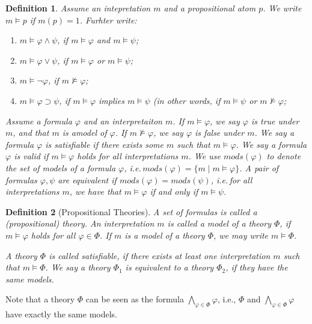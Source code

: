 \documentclass[12pt]{extarticle}
\newtheorem{definition}{Definition}
\begin{document}
\begin{definition}
  Assume an intepretation $m$ and a propositional atom $p$. We write
  $m\models p$ if $m(p)=1$. Furhter write:
  \begin{enumerate}
  \item $m \models \varphi \land \psi  $, if $m \models \varphi$ and $m \models \psi$;
  \item $m \models \varphi \lor \psi  $, if $m \models \varphi$ or $m \models \psi$;
  \item $m \models \neg \varphi $, if $m \not\models \varphi$;
  \item $m \models  \varphi \supset \psi$, if $m \models  \varphi $ implies $m \models  \psi$ (in other words, if  $m \models  \psi$ or  $m \not\models  \varphi $;
    
  \end{enumerate}
  Assume a formula $\varphi$ and an interpretaiton $m$. If
  $m\models \varphi$, we say $\varphi$ is \emph{true under} $m$, and
  that $m$ is a\emph{model} of $\varphi$. If $m\not\models \varphi$,
  we say $\varphi$ is \emph{false under} $m$. We say a formula
  $\varphi$ is \emph{satisfiable} if there exists some $m$ such that
  $m\models \varphi$. \stresspoint We say a formula $\varphi$ is \emph{valid} if
  $m\models \varphi$ holds for all interpretations $m$. \stresspoint We use
  $\mathit{mods}(\varphi)$ to denote the set of models of a formula
  $\varphi$, i.e.\,$\mathit{mods}(\varphi)=\{m\mid m\models\varphi\}$.
  A pair of formulas $\varphi,\psi$ are \emph{equivalent} if
  $\mathit{mods}(\varphi)=\mathit{mods}(\psi)$, i.e.\,for all
  interpretations $m$, we have that $m\models \varphi$ if and only if
  $m\models \psi$.
\end{definition}
\nextslide
\begin{definition}[Propositional Theories]
  A set of formulas is called a \emph{(propositional) theory}. An
  interpretation $m$ is called a \emph{model} of a theory $\Phi$, if
  $m\models \varphi$ holds for all $\varphi\in \Phi$. If $m$ is a model of a
  theory $\Phi$, we may write $m\models \Phi$.

  A theory $\Phi$ is called \emph{satisfiable}, if there exists at
  least one interpretation $m$ such that $m\models \Phi$. We say a
  theory $\Phi_1$ is \emph{equivalent} to a theory $\Phi_2$, if they
  have the same models.
\end{definition}
Note that a theory $\Phi$ can be seen as the formula
$\bigwedge_{\varphi\in\Phi}\varphi$, i.e., $\Phi$ and
$\bigwedge_{\varphi\in\Phi}\varphi$ have exactly the same models.
\end{document}
